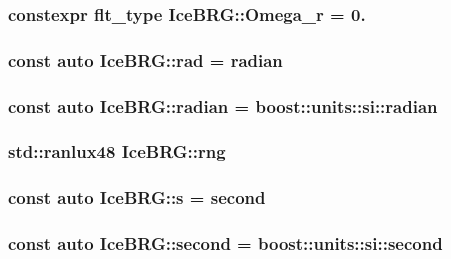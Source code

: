 \hypertarget{namespaceIceBRG_a8861a491b3586ab09c51c1bfc9020698}{
\subsubsection[{Omega\-\_\-r}]{\setlength{\rightskip}{0pt plus 5cm}constexpr {\bf flt\-\_\-type} Ice\-B\-R\-G\-::\-Omega\-\_\-r = 0.}}\label{namespaceIceBRG_a8861a491b3586ab09c51c1bfc9020698}
\hypertarget{namespaceIceBRG_a556de4acca26a5661d50a5b75880e95f}{
\subsubsection[{rad}]{\setlength{\rightskip}{0pt plus 5cm}const auto Ice\-B\-R\-G\-::rad = {\bf radian}}}\label{namespaceIceBRG_a556de4acca26a5661d50a5b75880e95f}
\hypertarget{namespaceIceBRG_af78fec3f42ee23d596793328b8991468}{
\subsubsection[{radian}]{\setlength{\rightskip}{0pt plus 5cm}const auto Ice\-B\-R\-G\-::radian = boost\-::units\-::si\-::radian}}\label{namespaceIceBRG_af78fec3f42ee23d596793328b8991468}
\hypertarget{namespaceIceBRG_a43349d2fe56e49b46f2da45c2472137d}{
\subsubsection[{rng}]{\setlength{\rightskip}{0pt plus 5cm}std\-::ranlux48 Ice\-B\-R\-G\-::rng}}\label{namespaceIceBRG_a43349d2fe56e49b46f2da45c2472137d}
\hypertarget{namespaceIceBRG_ad0b9ada1ad5ccc9d88c2050483109e06}{
\subsubsection[{s}]{\setlength{\rightskip}{0pt plus 5cm}const auto Ice\-B\-R\-G\-::s = {\bf second}}}\label{namespaceIceBRG_ad0b9ada1ad5ccc9d88c2050483109e06}
\hypertarget{namespaceIceBRG_a542d4177a57d87415daf841cf88e6b15}{
\subsubsection[{second}]{\setlength{\rightskip}{0pt plus 5cm}const auto Ice\-B\-R\-G\-::second = boost\-::units\-::si\-::second}}\label{namespaceIceBRG_a542d4177a57d87415daf841cf88e6b15}
